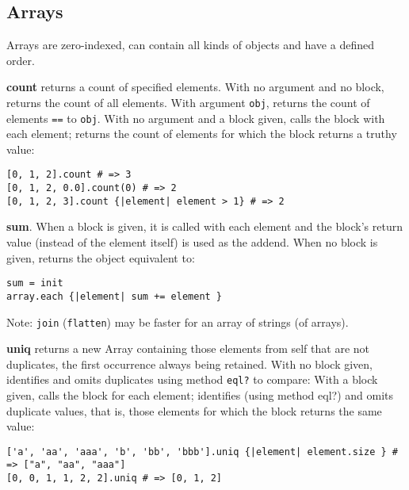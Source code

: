 
\subsection{Arrays}
Arrays are zero-indexed, can contain all kinds of objects and have a defined order.

\textbf{count} returns a count of specified elements.
With no argument and no block, returns the count of all elements.
With argument \texttt{obj}, returns the count of elements \texttt{==} to \texttt{obj}.
With no argument and a block given, calls the block with each element; returns the count of elements for which the block returns a truthy value:
\begin{verbatim}
[0, 1, 2].count # => 3
[0, 1, 2, 0.0].count(0) # => 2
[0, 1, 2, 3].count {|element| element > 1} # => 2
\end{verbatim}

\textbf{sum}.
When a block is given, it is called with each element and the block’s return value (instead of the element itself) is used as the addend.
When no block is given, returns the object equivalent to:
\begin{verbatim}
sum = init
array.each {|element| sum += element }
\end{verbatim}
Note: \texttt{join} (\texttt{flatten}) may be faster for an array of strings (of arrays).

\textbf{uniq} returns a new Array containing those elements from self that are not duplicates, the first occurrence always being retained.
With no block given, identifies and omits duplicates using method \texttt{eql?} to compare:
With a block given, calls the block for each element; identifies (using method eql?) and omits duplicate values, that is, those elements for which the block returns the same value:
\begin{verbatim}
['a', 'aa', 'aaa', 'b', 'bb', 'bbb'].uniq {|element| element.size } # => ["a", "aa", "aaa"]
[0, 0, 1, 1, 2, 2].uniq # => [0, 1, 2]
\end{verbatim}


